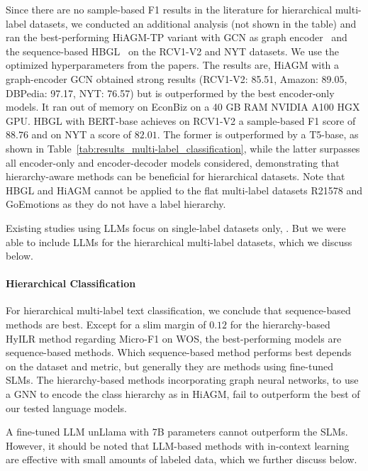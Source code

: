 \documentclass[lettersize,journal]{IEEEtran}
\newcommand{\SLMs}{SLMs\xspace}
\newcommand{\LLM}{LLM\xspace}
\newcommand{\LLMs}{LLMs\xspace}
\begin{document}
Since there are no sample-based F1 results in the literature for hierarchical multi-label datasets, we conducted an additional analysis (not shown in the table) and ran the best-performing HiAGM-TP variant with GCN as graph encoder~\cite{hiagm} and the sequence-based HBGL~\cite{hbgl} on the  RCV1-V2 and NYT datasets.
We use the optimized hyperparameters from the papers.
The results are, HiAGM with a graph-encoder GCN obtained strong results (RCV1-V2: 85.51, Amazon: 89.05, DBPedia: 97.17, NYT: 76.57) but is outperformed by the best encoder-only models.
It ran out of memory on EconBiz on a 40 GB RAM NVIDIA A100 HGX GPU.
HBGL with BERT-base achieves on RCV1-V2 a sample-based F1 score of $88.76$ 
and on NYT a score of $82.01$. 
The former is outperformed by a T5-base, as shown in Table~\ref{tab:results_multi-label_classification}, while the latter surpasses all encoder-only and encoder-decoder models considered, demonstrating that hierarchy-aware methods can be beneficial for hierarchical datasets.
Note that HBGL and HiAGM cannot be applied to the flat multi-label datasets R21578 and GoEmotions as they do not have a label hierarchy.

Existing studies using \LLMs focus on single-label datasets only, \eg \cite{pushing-the-limit-11346014-rgpt,DBLP:conf/emnlp/PecherSB25-100-samples}.
But we were able to include \LLMs for the hierarchical multi-label datasets, which we discuss below.

\paragraph{Hierarchical Classification}

For hierarchical multi-label text classification, we conclude that sequence-based methods are best.
Except for a slim margin of $0.12$ for the hierarchy-based HyILR method regarding Micro-F1 on WOS, the best-performing models are sequence-based methods.
Which sequence-based method performs best depends on the dataset and metric, but generally they are methods using fine-tuned \SLMs. 
The hierarchy-based methods incorporating graph neural networks, \eg to use a GNN to encode the class hierarchy as in HiAGM, fail to outperform the best of our tested language models.

A fine-tuned \LLM unLlama with 7B parameters cannot outperform the \SLMs. 
However, it should be noted that \LLM-based methods with in-context learning are effective with small amounts of labeled data, which we further discuss below.
\end{document}
